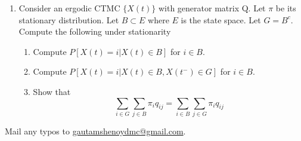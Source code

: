 \documentclass[a4paper,10pt]{article}
\begin{document}
\begin{enumerate}
\item Consider an ergodic CTMC $\{X(t)\}$ with generator matrix Q. Let $\pi$ be its stationary distribution. Let $B \subset E$ where $E$ is the state space. Let $G=B^c$. Compute the following under stationarity
\begin{enumerate}
	\item Compute $P[X(t) = i|X(t) \in B]$ for $i \in B$.
	\item Compute $P[X(t) = i|X(t) \in B, X(t^-) \in G]$ for $i \in B$.
	\item Show that 
	\[ \sum_{i \in G}\sum_{j \in B} \pi_i q_{ij} = \sum_{i \in B}\sum_{j \in G} \pi_i q_{ij}\]
\end{enumerate}
	
\end{enumerate}

Mail any typos to \url{gautamshenoydmc@gmail.com}.
\end{document}
